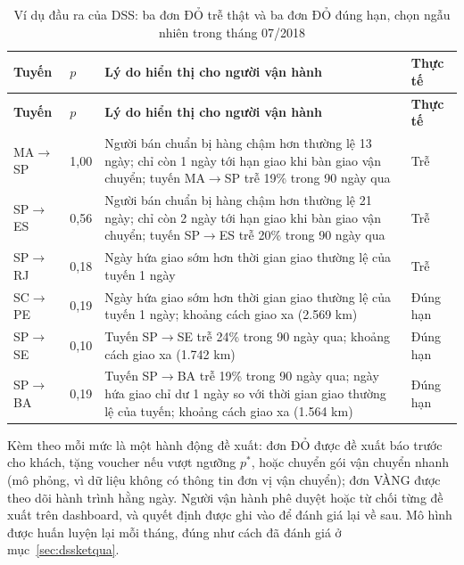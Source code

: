 \begingroup\small{}
\begin{longtable}{|P{1.6cm}|P{1.0cm}|>{\raggedright\arraybackslash}p{8.2cm}|P{1.6cm}|}
\caption{Ví dụ đầu ra của DSS: ba đơn ĐỎ trễ thật và ba đơn ĐỎ đúng hạn, chọn ngẫu nhiên trong tháng 07/2018}\label{tab:dssvidu}\\
\hline
\textbf{Tuyến} & \textbf{$p$} & \textbf{Lý do hiển thị cho người vận hành} & \textbf{Thực tế}\\ \hline \endfirsthead
\hline
\textbf{Tuyến} & \textbf{$p$} & \textbf{Lý do hiển thị cho người vận hành} & \textbf{Thực tế}\\ \hline \endhead
MA$\rightarrow$SP & 1,00 & Người bán chuẩn bị hàng chậm hơn thường lệ 13 ngày; chỉ còn 1 ngày tới hạn giao khi bàn giao vận chuyển; tuyến MA$\rightarrow$SP trễ 19\% trong 90 ngày qua & Trễ\\ \hline
SP$\rightarrow$ES & 0,56 & Người bán chuẩn bị hàng chậm hơn thường lệ 21 ngày; chỉ còn 2 ngày tới hạn giao khi bàn giao vận chuyển; tuyến SP$\rightarrow$ES trễ 20\% trong 90 ngày qua & Trễ\\ \hline
SP$\rightarrow$RJ & 0,18 & Ngày hứa giao sớm hơn thời gian giao thường lệ của tuyến 1 ngày & Trễ\\ \hline
SC$\rightarrow$PE & 0,19 & Ngày hứa giao sớm hơn thời gian giao thường lệ của tuyến 1 ngày; khoảng cách giao xa (2.569 km) & Đúng hạn\\ \hline
SP$\rightarrow$SE & 0,10 & Tuyến SP$\rightarrow$SE trễ 24\% trong 90 ngày qua; khoảng cách giao xa (1.742 km) & Đúng hạn\\ \hline
SP$\rightarrow$BA & 0,19 & Tuyến SP$\rightarrow$BA trễ 19\% trong 90 ngày qua; ngày hứa giao chỉ dư 1 ngày so với thời gian giao thường lệ của tuyến; khoảng cách giao xa (1.564 km) & Đúng hạn\\ \hline
\end{longtable}
\endgroup

Kèm theo mỗi mức là một hành động đề xuất: đơn ĐỎ được đề xuất báo trước cho khách, tặng voucher nếu vượt ngưỡng $p^{*}$, hoặc chuyển gói vận chuyển nhanh (mô phỏng, vì dữ liệu không có thông tin đơn vị vận chuyển); đơn VÀNG được theo dõi hành trình hằng ngày. Người vận hành phê duyệt hoặc từ chối từng đề xuất trên dashboard, và quyết định được ghi vào  để đánh giá lại về sau. Mô hình được huấn luyện lại mỗi tháng, đúng như cách đã đánh giá ở mục~\ref{sec:dssketqua}.

